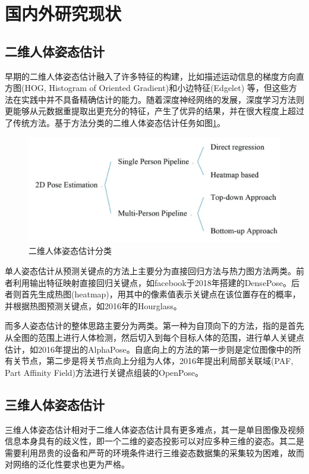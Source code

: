\section{国内外研究现状}

\subsection{二维人体姿态估计}{}

早期的二维人体姿态估计融入了许多特征的构建，比如描述运动信息的梯度方向直方图(HOG, Histogram of Oriented Gradient)和小边特征(Edgelet)
等，但这些方法在实践中并不具备精确估计的能力。随着深度神经网络的发展，深度学习方法则更能够从元数据重提取出更充分的特征，产生了优异的结果，并在很大程度上超过了传统方法。基于方法分类的二维人体姿态估计任务如图\ref{fig:f5}。

\begin{figure}[h]
	\centering
	\includegraphics[scale=0.6]{figures/5.png}
	\caption{二维人体姿态估计分类}
	\label{fig:f5}
\end{figure}

单人姿态估计从预测关键点的方法上主要分为直接回归方法与热力图方法两类。前者利用输出特征映射直接回归关键点，如facebook于2018年搭建的DensePose。后者则首先生成热图(heatmap)，用其中的像素值表示关键点在该位置存在的概率，并根据热图预测关键点，如2016年的Hourglass。

而多人姿态估计的整体思路主要分为两类。第一种为自顶向下的方法，指的是首先从全图的范围上进行人体检测，然后切入到每个目标人体的范围，进行单人关键点估计，如2016年提出的AlphaPose。自底向上的方法的第一步则是定位图像中的所有关节点，第二步是将关节点向上分组为人体，2016年提出利局部关联域(PAF, Part Affinity Field)方法进行关键点组装的OpenPose。

\subsection{三维人体姿态估计}{}
三维人体姿态估计相对于二维人体姿态估计具有更多难点，其一是单目图像及视频信息本身具有的歧义性，即一个二维的姿态投影可以对应多种三维的姿态。其二是需要利用昂贵的设备和严苛的环境条件进行三维姿态数据集的采集较为困难，故而对网络的泛化性要求也更为严格。

